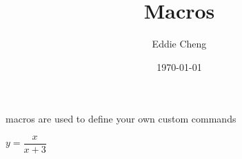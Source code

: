 \documentclass[12pt,a4paper]{article}
\title{Macros}
\author{Eddie Cheng}
\date{\today}
\def\eq1{y = \dfrac{x}{x+3}}
\begin{document}
\maketitle
macros are used to define your own custom commands


$\eq1$
\end{document}
